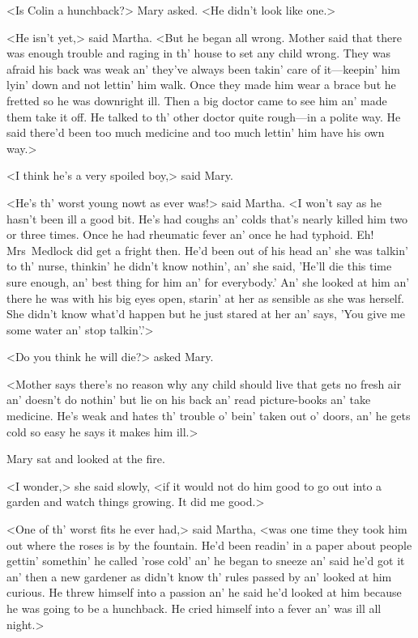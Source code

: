 <Is Colin a hunchback?> Mary asked. <He didn't look like one.>

<He isn't yet,> said Martha. <But he began all wrong. Mother said that there was enough trouble and raging in th' house to set any child wrong. They was afraid his back was weak an' they've always been takin' care of it—keepin' him lyin' down and not lettin' him walk. Once they made him wear a brace but he fretted so he was downright ill. Then a big doctor came to see him an' made them take it off. He talked to th' other doctor quite rough—in a polite way. He said there'd been too much medicine and too much lettin' him have his own way.>

<I think he's a very spoiled boy,> said Mary.

<He's th' worst young nowt as ever was!> said Martha. <I won't say as he hasn't been ill a good bit. He's had coughs an' colds that's nearly killed him two or three times. Once he had rheumatic fever an' once he had typhoid. Eh! Mrs~Medlock did get a fright then. He'd been out of his head an' she was talkin' to th' nurse, thinkin' he didn't know nothin', an' she said, 'He'll die this time sure enough, an' best thing for him an' for everybody.' An' she looked at him an' there he was with his big eyes open, starin' at her as sensible as she was herself. She didn't know what'd happen but he just stared at her an' says, 'You give me some water an' stop talkin'.'>

<Do you think he will die?> asked Mary.

<Mother says there's no reason why any child should live that gets no fresh air an' doesn't do nothin' but lie on his back an' read picture-books an' take medicine. He's weak and hates th' trouble o' bein' taken out o' doors, an' he gets cold so easy he says it makes him ill.>

Mary sat and looked at the fire.

<I wonder,> she said slowly, <if it would not do him good to go out into a garden and watch things growing. It did me good.>

<One of th' worst fits he ever had,> said Martha, <was one time they took him out where the roses is by the fountain. He'd been readin' in a paper about people gettin' somethin' he called 'rose cold' an' he began to sneeze an' said he'd got it an' then a new gardener as didn't know th' rules passed by an' looked at him curious. He threw himself into a passion an' he said he'd looked at him because he was going to be a hunchback. He cried himself into a fever an' was ill all night.>

